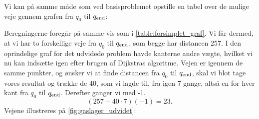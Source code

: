 Vi kan på samme måde som ved basisproblemet opstille en tabel over de mulige veje gennem grafen fra $q_0$ til $q_{\textrm{end}}$:

 


Beregningerne foregår på samme vis som i \autoref{table:forsimplet_graf}. Vi får dermed, at vi har to forskellige veje fra $q_{0}$ til $q_{\textrm{end}}$, som begge har distancen 257. I den oprindelige graf for det udvidede problem havde kanterne andre vægte, hvilket vi nu kan indsætte igen efter brugen af Dijkstras algoritme. Vejen er igennem de samme punkter, og ønsker vi at finde distancen fra $q_{0}$ til $q_{\textrm{end}}$, skal vi blot tage vores resultat og trække de 40, som vi lagde til, fra igen 7 gange, altså en for hver kant fra $q_{0}$ til $q_{\textrm{end}}$. Derefter ganger vi med -1.
\begin{equation}
(257-40 \cdot 7)(-1) = 23.
\end{equation}
Vejene illustreres på \autoref{fig:gaslager_udvidet}:



